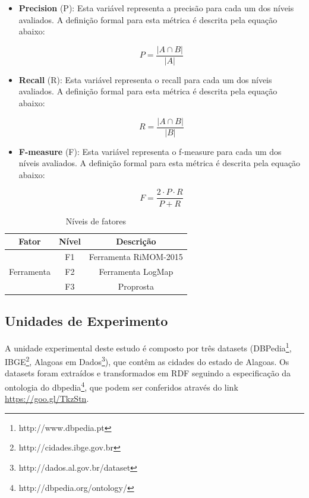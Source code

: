 \begin{itemize}
\item \textbf{Precision} (P): Esta variável representa a precisão para cada um dos níveis avaliados. A definição formal para esta métrica é descrita pela equação abaixo:

\begin{equation}
P = \dfrac{|{A}\cap{B}|}{|A|}
\end{equation}

\item \textbf{Recall} (R): Esta variável representa o recall para cada um dos níveis avaliados. A definição formal para esta métrica é descrita pela equação abaixo:

\begin{equation}
R = \dfrac{|{A}\cap{B}|}{|B|}
\end{equation}

\item \textbf{F-measure} (F): Esta variável representa o f-measure para cada um dos níveis avaliados. A definição formal para esta métrica é descrita pela equação abaixo:

\begin{equation}
F = \dfrac{{2}\cdot{P}\cdot{R}}{P+R}
\end{equation}

\end{itemize}

\begin{table}[]
\centering
\caption{Níveis de fatores}
\label{tab:factor_levels}
\begin{tabular}{|c|c|c|}
\hline
\textbf{Fator}              & \textbf{Nível} & \textbf{Descrição}    \\ \hline
\multirow{3}{*}{Ferramenta} & F1             & Ferramenta RiMOM-2015 \\ \cline{2-3} 
                            & F2             & Ferramenta LogMap     \\ \cline{2-3} 
                            & F3             & Proprosta             \\ \hline
\end{tabular}
\end{table}

\subsection{Unidades de Experimento}
A unidade experimental deste estudo é composto por três datasets (DBPedia\footnote{http://www.dbpedia.pt}, IBGE\footnote{http://cidades.ibge.gov.br
}, Alagoas em Dados\footnote{http://dados.al.gov.br/dataset}), que contêm as cidades do estado de Alagoas. Os datasets  foram extraídos e transformados em RDF  seguindo a especificação da ontologia do dbpedia\footnote{http://dbpedia.org/ontology/}, que podem ser conferidos através do link \url{https://goo.gl/TkzStn}.

